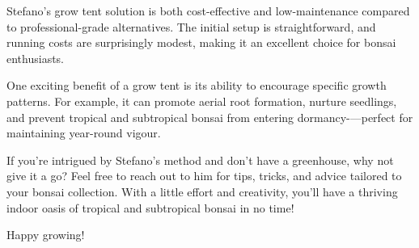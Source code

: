 \medskip
{}
\noindent
Stefano's grow tent solution is both cost\--effective and low\--maintenance compared to professional\--grade alternatives. 
The initial setup is straightforward, and running costs are surprisingly modest, making it an excellent choice for bonsai enthusiasts.  

\medskip
{}
\noindent
One exciting benefit of a grow tent is its ability to encourage specific growth patterns. 
For example, it can promote aerial root formation, nurture seedlings, and prevent tropical and subtropical bonsai from entering dormancy\--—perfect for maintaining year\--round vigour.  

\medskip
{}
\noindent
If you're intrigued by Stefano's method and don't have a greenhouse, why not give it a go? 
Feel free to reach out to him for tips, tricks, and advice tailored to your bonsai collection. 
With a little effort and creativity, you'll have a thriving indoor oasis of tropical and subtropical bonsai in no time!  

Happy growing!

\closearticle
